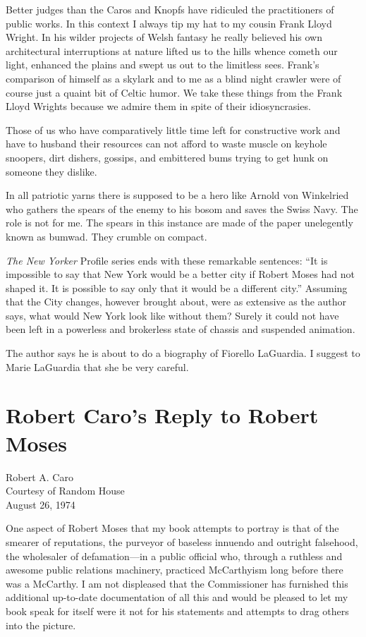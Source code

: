\documentclass[11pt,letterpaper]{article}
\begin{document}
Better judges than the Caros and Knopfs have ridiculed the practitioners of public works. In this context I always tip my hat to my cousin Frank Lloyd Wright. In his wilder projects of Welsh fantasy he really believed his own architectural interruptions at nature lifted us to the hills whence cometh our light, enhanced the plains and swept us out to the limitless sees. Frank's comparison of himself as a skylark and to me as a blind night crawler were of course just a quaint bit of Celtic humor. We take these things from the Frank Lloyd Wrights because we admire them in spite of their idiosyncrasies.

Those of us who have comparatively little time left for constructive work and have to husband their resources can not afford to waste muscle on keyhole snoopers, dirt dishers, gossips, and embittered bums trying to get hunk on someone they dislike.

In all patriotic yarns there is supposed to be a hero like Arnold von Winkelried who gathers the spears of the enemy to his bosom and saves the Swiss Navy. The role is not for me. The spears in this instance are made of the paper unelegently known as bumwad. They crumble on compact.

\textit{The New Yorker} Profile series ends with these remarkable sentences: \enquote{It is impossible to say that New York would be a better city if Robert Moses had not shaped it. It is possible to say only that it would be a different city.} Assuming that the City changes, however brought about, were as extensive as the author says, what would New York look like without them? Surely it could not have been left in a powerless and brokerless state of chassis and suspended animation.

The author says he is about to do a biography of Fiorello LaGuardia. I suggest to Marie LaGuardia that she be very careful.

\newpage

\section*{Robert Caro's Reply to Robert Moses}

\noindent Robert A. Caro\\
\noindent Courtesy of Random House\\
\noindent August 26, 1974
\vspace{1cm}

\noindent One aspect of Robert Moses that my book attempts to portray is that of the smearer of reputations, the purveyor of baseless innuendo and outright falsehood, the wholesaler of defamation---in a public official who, through a ruthless and awesome public relations machinery, practiced McCarthyism long before there was a McCarthy. I am not displeased that the Commissioner has furnished this additional up-to-date documentation of all this and would be pleased to let my book speak for itself were it not for his statements and attempts to drag others into the picture.
\end{document}

